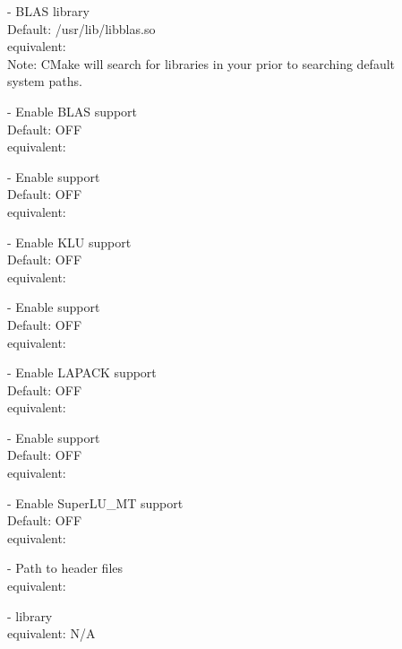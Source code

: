 \begin{description}
\item[] -
  BLAS library
  \\
  Default: /usr/lib/libblas.so
  \\
  {\sundials} equivalent: 
  \\
  Note: CMake will search for libraries in your  prior
  to searching default system paths.
\item[] -
  Enable BLAS support
  \\
  Default: OFF
  \\
  {\sundials} equivalent: 
\item[] -
  Enable {\hypre} support
  \\
  Default: OFF
  \\
  {\sundials} equivalent: 
\item[] -
  Enable KLU support
  \\
  Default: OFF
  \\
  {\sundials} equivalent: 
\item[] -
  Enable {\petsc} support
  \\
  Default: OFF
  \\
  {\sundials} equivalent: 
\item[] -
  Enable LAPACK support
  \\
  Default: OFF
  \\
  {\sundials} equivalent: 
\item[] -
  Enable {\superludist} support
  \\
  Default: OFF
  \\
  {\sundials} equivalent: 
\item[] -
  Enable SuperLU\_MT support
  \\
  Default: OFF
  \\
  {\sundials} equivalent: 
\item[] -
  Path to {\hypre} header files
  \\
  {\sundials} equivalent: 
\item[] -
  {\hypre} library
  \\
  {\sundials} equivalent: N/A

\end{description}
